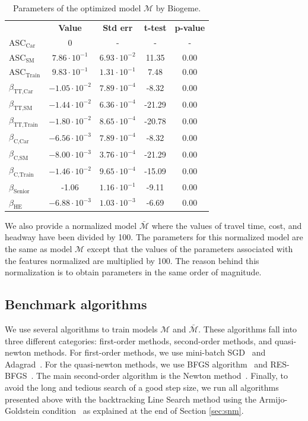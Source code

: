 \documentclass[conference]{IEEEtran}
\newcommand{\E}[1]{\cdot10^{#1}}
\begin{document}
\begin{table}
\centering
\renewcommand\arraystretch{1.2}
\begin{tabular}{l|cccc}
\multicolumn{1}{l}{} & {\bf Value} & {\bf Std err} & {\bf t-test} & {\bf p-value} \\ \cline{2-5}
$\text{ASC}_{\text{Car}}$ & 0 & - & - & - \\
$\text{ASC}_{\text{SM}}$ & $7.86\E{-1}$ & $6.93\E{-2}$ & 11.35 & 0.00 \\
$\text{ASC}_{\text{Train}}$ & $9.83\E{-1}$ & $1.31\E{-1}$ & 7.48 & 0.00 \\
$\beta_{\text{TT,Car}}$ & $-1.05\E{-2}$ & $7.89\E{-4}$ & -8.32 & 0.00 \\
$\beta_{\text{TT,SM}}$ & $-1.44\E{-2}$ & $6.36\E{-4}$ & -21.29 & 0.00 \\
$\beta_{\text{TT,Train}}$ & $-1.80\E{-2}$ & $8.65\E{-4}$ & -20.78 & 0.00 \\
$\beta_{\text{C,Car}}$ & $-6.56\E{-3}$ & $7.89\E{-4}$ & -8.32 & 0.00 \\
$\beta_{\text{C,SM}}$ & $-8.00\E{-3}$ & $3.76\E{-4}$ & -21.29 & 0.00 \\
$\beta_{\text{C,Train}}$ & $-1.46\E{-2}$ & $9.65\E{-4}$ & -15.09 & 0.00 \\
$\beta_{\text{Senior}}$ & -1.06 & $1.16\E{-1}$ & -9.11 & 0.00 \\
$\beta_{\text{HE}}$ & $-6.88\E{-3}$ & $1.03\E{-3}$ & -6.69 & 0.00
\end{tabular}
\caption{\label{tab:res_biogeme} Parameters of the optimized model $\mathcal{M}$ by Biogeme.}
\vspace{-0.8cm}
\end{table}

We also provide a normalized model $\bar{\mathcal{M}}$ where the values of travel time, cost, and headway have been divided by 100. The parameters for this normalized model are the same as model $\mathcal{M}$ except that the values of the parameters associated with the features normalized are multiplied by 100. The reason behind this normalization is to obtain parameters in the same order of magnitude. \\

\subsection{Benchmark algorithms}
\label{sec:algorithms}

We use several algorithms to train models $\mathcal{M}$ and $\bar{\mathcal{M}}$. These algorithms fall into three different categories: first-order methods, second-order methods, and quasi-newton methods. For first-order methods, we use mini-batch SGD~\cite{ruder_overview_2016} and Adagrad~\cite{duchi_adaptive_2011}. For the quasi-newton methods, we use BFGS algorithm~\cite{fletcher_practical_1987} and RES-BFGS~\cite{mokhtari_res:_2014}. The main second-order algorithm is the Newton method~\cite{caswell_treatise_1685}. Finally, to avoid the long and tedious search of a good step size, we run all algorithms presented above with the backtracking Line Search method using the Armijo-Goldstein condition~\cite{armijo_minimization_1966} as explained at the end of Section \ref{sec:snm}. \\
\end{document}
